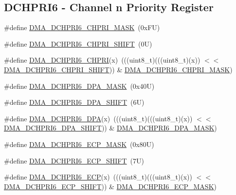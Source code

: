 \subsection*{D\+C\+H\+P\+R\+I6 -\/ Channel n Priority Register}
\begin{DoxyCompactItemize}
\item 
\#define \mbox{\hyperlink{group___d_m_a___register___masks_ga30dc9b09d09c54838004e9c23a16c6b7}{D\+M\+A\+\_\+\+D\+C\+H\+P\+R\+I6\+\_\+\+C\+H\+P\+R\+I\+\_\+\+M\+A\+SK}}~(0x\+F\+U)
\item 
\#define \mbox{\hyperlink{group___d_m_a___register___masks_gac12a93574812e9019f2e7dc31e844205}{D\+M\+A\+\_\+\+D\+C\+H\+P\+R\+I6\+\_\+\+C\+H\+P\+R\+I\+\_\+\+S\+H\+I\+FT}}~(0\+U)
\item 
\#define \mbox{\hyperlink{group___d_m_a___register___masks_gabc1596123bcd7d1c8072729515b44d0f}{D\+M\+A\+\_\+\+D\+C\+H\+P\+R\+I6\+\_\+\+C\+H\+P\+RI}}(x)~(((uint8\+\_\+t)(((uint8\+\_\+t)(x)) $<$$<$ \mbox{\hyperlink{group___d_m_a___register___masks_gac12a93574812e9019f2e7dc31e844205}{D\+M\+A\+\_\+\+D\+C\+H\+P\+R\+I6\+\_\+\+C\+H\+P\+R\+I\+\_\+\+S\+H\+I\+FT}})) \& \mbox{\hyperlink{group___d_m_a___register___masks_ga30dc9b09d09c54838004e9c23a16c6b7}{D\+M\+A\+\_\+\+D\+C\+H\+P\+R\+I6\+\_\+\+C\+H\+P\+R\+I\+\_\+\+M\+A\+SK}})
\item 
\#define \mbox{\hyperlink{group___d_m_a___register___masks_gaf4b1d9494691bb0d118593c119789378}{D\+M\+A\+\_\+\+D\+C\+H\+P\+R\+I6\+\_\+\+D\+P\+A\+\_\+\+M\+A\+SK}}~(0x40\+U)
\item 
\#define \mbox{\hyperlink{group___d_m_a___register___masks_gaeb900ebd7efd790f06ce39a68735defa}{D\+M\+A\+\_\+\+D\+C\+H\+P\+R\+I6\+\_\+\+D\+P\+A\+\_\+\+S\+H\+I\+FT}}~(6\+U)
\item 
\#define \mbox{\hyperlink{group___d_m_a___register___masks_ga092dd6da993a741820d44bc18aca9f91}{D\+M\+A\+\_\+\+D\+C\+H\+P\+R\+I6\+\_\+\+D\+PA}}(x)~(((uint8\+\_\+t)(((uint8\+\_\+t)(x)) $<$$<$ \mbox{\hyperlink{group___d_m_a___register___masks_gaeb900ebd7efd790f06ce39a68735defa}{D\+M\+A\+\_\+\+D\+C\+H\+P\+R\+I6\+\_\+\+D\+P\+A\+\_\+\+S\+H\+I\+FT}})) \& \mbox{\hyperlink{group___d_m_a___register___masks_gaf4b1d9494691bb0d118593c119789378}{D\+M\+A\+\_\+\+D\+C\+H\+P\+R\+I6\+\_\+\+D\+P\+A\+\_\+\+M\+A\+SK}})
\item 
\#define \mbox{\hyperlink{group___d_m_a___register___masks_gaa5c231f95cecf67801dc43ea987a5caf}{D\+M\+A\+\_\+\+D\+C\+H\+P\+R\+I6\+\_\+\+E\+C\+P\+\_\+\+M\+A\+SK}}~(0x80\+U)
\item 
\#define \mbox{\hyperlink{group___d_m_a___register___masks_ga467da6c912746a19226a13ba1d2ff1c1}{D\+M\+A\+\_\+\+D\+C\+H\+P\+R\+I6\+\_\+\+E\+C\+P\+\_\+\+S\+H\+I\+FT}}~(7\+U)
\item 
\#define \mbox{\hyperlink{group___d_m_a___register___masks_gaada37f0083cde5840d1849bf771eb9a7}{D\+M\+A\+\_\+\+D\+C\+H\+P\+R\+I6\+\_\+\+E\+CP}}(x)~(((uint8\+\_\+t)(((uint8\+\_\+t)(x)) $<$$<$ \mbox{\hyperlink{group___d_m_a___register___masks_ga467da6c912746a19226a13ba1d2ff1c1}{D\+M\+A\+\_\+\+D\+C\+H\+P\+R\+I6\+\_\+\+E\+C\+P\+\_\+\+S\+H\+I\+FT}})) \& \mbox{\hyperlink{group___d_m_a___register___masks_gaa5c231f95cecf67801dc43ea987a5caf}{D\+M\+A\+\_\+\+D\+C\+H\+P\+R\+I6\+\_\+\+E\+C\+P\+\_\+\+M\+A\+SK}})
\end{DoxyCompactItemize}
